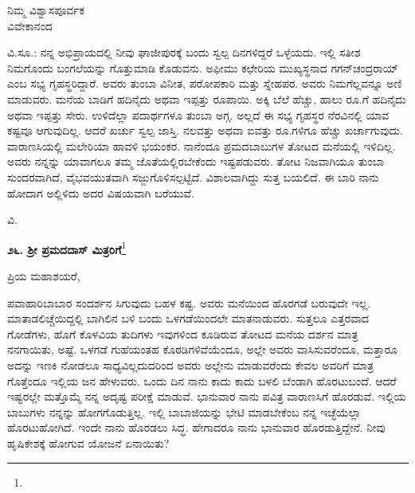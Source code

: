 \begin{flushright}
ನಿಮ್ಮ ವಿಶ್ವಾಸಪೂರ್ವಕ\\ವಿವೇಕಾನಂದ
\end{flushright}

\vspace{-0.25cm}

ವಿ.ಸೂ.:\enginline{-} ನನ್ನ ಅಭಿಪ್ರಾಯದಲ್ಲಿ ನೀವು ಘಾಜೀಪುರಕ್ಕೆ ಬಂದು ಸ್ವಲ್ಪ ದಿನಗಳಿದ್ದರೆ ಒಳ್ಳೆಯದು. ಇಲ್ಲಿ ಸತೀಶ ನಿಮಗೊಂದು ಬಂಗಲೆಯನ್ನು ಗೊತ್ತುಮಾಡಿ ಕೊಡುವನು. ಅಫೀಮು ಕಛೇರಿಯ ಮುಖ್ಯಸ್ಥನಾದ ಗಗನ್‌ಚಂದ್ರರಾಯ್ ಎಂಬ ಸಭ್ಯ ಗೃಹಸ್ಥರಿದ್ದಾರೆ. ಅವರು ತುಂಬಾ ವಿನೀತ, ಪರೋಪಕಾರಿ ಮತ್ತು ಸ್ನೇಹಪರ. ಅವರು ನಿಮಗೆಲ್ಲವನ್ನೂ ಅಣಿ ಮಾಡುವರು. ಮನೆಯ ಬಾಡಿಗೆ ಹದಿನೈದು ಅಥವಾ ಇಪ್ಪತ್ತು ರೂಪಾಯಿ. ಅಕ್ಕಿ ಬೆಲೆ ಹೆಚ್ಚು, ಹಾಲು ರೂ.ಗೆ ಹದಿನೈದು ಅಥವಾ ಇಪ್ಪತ್ತು ಸೇರು. ಉಳಿದೆಲ್ಲಾ ಪದಾರ್ಥಗಳೂ ತುಂಬಾ ಅಗ್ಗ. ಅಲ್ಲದೆ ಈ ಸಭ್ಯ ಗೃಹಸ್ಥರ ನೆರವಿನಲ್ಲಿ ಯಾವ ಕಷ್ಟವೂ ಆಗುವುದಿಲ್ಲ. ಆದರೆ ಖರ್ಚು ಸ್ವಲ್ಪ ಜಾಸ್ತಿ. ನಲವತ್ತು ಅಥವಾ ಐವತ್ತು ರೂ.ಗಳಿಗೂ ಹೆಚ್ಚು ಖರ್ಚಾಗುವುದು. ವಾರಾಣಸಿಯಲ್ಲಿ ಮಲೇರಿಯಾ ಹಾವಳಿ ಭಯಂಕರ. ನಾನೆಂದೂ ಪ್ರಮದಬಾಬುಗಳ ತೋಟದ ಮನೆಯಲ್ಲಿ ಇಳಿದಿಲ್ಲ. ಅವರು ನನ್ನನ್ನು ಯಾವಾಗಲೂ ತಮ್ಮ ಜೊತೆಯಲ್ಲಿರಬೇಕೆಂದು ಇಷ್ಟಪಡುವರು. ತೋಟ ನಿಜವಾಗಿಯೂ ತುಂಬಾ ಸುಂದರವಾಗಿದೆ, ವೈಭವಯುತವಾಗಿ ಸಜ್ಜುಗೊಳಿಸಲ್ಪಟ್ಟಿದೆ. ವಿಶಾಲವಾಗಿದ್ದು ಸುತ್ತ ಬಯಲಿದೆ. ಈ ಬಾರಿ ನಾನು ಹೋದಾಗ ಅಲ್ಲಿಳಿದು ಅದರ ವಿಷಯವಾಗಿ ಬರೆಯುವೆ.

\vspace{-0.45cm}

{\flushright
ವಿ.\par}

\vfill\eject

\begin{center}
\textbf{೨೬. ಶ‍್ರೀ ಪ್ರಮದದಾಸ್ ಮಿತ್ರರಿಗೆ}\footnote{}
\end{center}

\vspace{-0.5cm}

\begin{flushright}
{\fontsize{11pt}{10pt}\selectfont{ಘಾಜೀಪುರ\\[-2pt] ೩೧ನೇ ಜನವರಿ ೧೮೯೦}}
\end{flushright}
\vspace{-0.3cm}

\noindent
ಪ್ರಿಯ ಮಹಾಶಯರೆ,

ಪವಾಹಾರಿಬಾಬಾರ ಸಂದರ್ಶನ ಸಿಗುವುದು ಬಹಳ ಕಷ್ಟ. ಅವರು ಮನೆಯಿಂದ ಹೊರಗಡೆ ಬರುವುದೇ ಇಲ್ಲ. ಮಾತಾಡಲಿಚ್ಚೆಯಿದ್ದಲ್ಲಿ ಬಾಗಿಲಿನ ಬಳಿ ಬಂದು ಒಳಗಡೆಯಿಂದಲೇ ಮಾತನಾಡುವರು. ಸುತ್ತಲೂ ಎತ್ತರವಾದ ಗೋಡೆಗಳು, ಹೊಗೆ ಕೊಳವಿಯ ತುದಿಗಳು ಇವುಗಳಿಂದ ಕೂಡಿರುವ ತೋಟದ ಮನೆಯ ದರ್ಶನ ಮಾತ್ರ ನನಗಾಯಿತು, ಅಷ್ಟೆ. ಒಳಗಡೆ ಗುಹೆಯಂತಹ ಕೊಠಡಿಗಳಿವೆಯೆಂದೂ, ಅಲ್ಲೇ ಅವರು ವಾಸಿಸುವರೆಂದೂ, ಮತ್ತಾರೂ ಅದನ್ನು ಇಣಕಿ ನೋಡಲೂ ಸಾಧ್ಯವಿಲ್ಲದುದರಿಂದ ಅವರು ಅಲ್ಲೇನು ಮಾಡುವರೆಂದು ಕೇವಲ ಅವರಿಗೆ ಮಾತ್ರ ಗೊತ್ತೆಂದೂ ಇಲ್ಲಿಯ ಜನ ಹೇಳುವರು. ಒಂದು ದಿನ ನಾನು ಕಾದು ಕಾದು ಬಳಲಿ ಬೆಂಡಾಗಿ ಹೊರಟುಬಂದೆ. ಆದರೆ ಇಷ್ಟರಲ್ಲೇ ಮತ್ತೊಮ್ಮೆ ನನ್ನ ಅದೃಷ್ಟ ಪರೀಕ್ಷೆ ಮಾಡುವೆ. ಭಾನುವಾರ ನಾನು ಪವಿತ್ರ ವಾರಾಣಸಿಗೆ ಹೊರಡುವೆ. ಇಲ್ಲಿಯ ಬಾಬುಗಳು ನನ್ನನ್ನು ಹೋಗಗೊಡುತ್ತಿಲ್ಲ. ಇಲ್ಲಿ ಬಾಬಾಜಿಯನ್ನು ಭೇಟಿ ಮಾಡಬೇಕೆಂಬ ನನ್ನ ಇಚ್ಛೆಯೆಲ್ಲಾ ಹೊರಟುಹೋಗಿದೆ. ಇಂದೇ ನಾನು ಹೊರಡಲು ಸಿದ್ಧ. ಹೇಗಾದರೂ ನಾನು ಭಾನುವಾರ ಹೊರಡುತ್ತಿದ್ದೇನೆ. ನೀವು ಹೃಷಿಕೇಶಕ್ಕೆ ಹೋಗುವ ಯೋಜನೆ ಏನಾಯಿತು?

